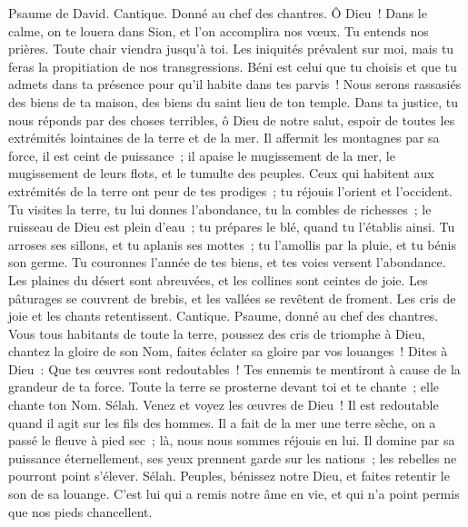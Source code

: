 \begin{multicols}{2}
\VerseOne{}Psaume de David. Cantique. Donné au chef des chantres.
Ô Dieu~! Dans le calme, on te louera dans Sion, et l'on accomplira nos vœux.
Tu entends nos prières. Toute chair viendra jusqu'à toi.
Les iniquités prévalent sur moi, mais tu feras la propitiation de nos transgressions.
Béni est celui que tu choisis et que tu admets dans ta présence pour qu'il habite dans tes parvis~! Nous serons rassasiés des biens de ta maison, des biens du saint lieu de ton temple.
Dans ta justice, tu nous réponds par des choses terribles, ô Dieu de notre salut, espoir de toutes les extrémités lointaines de la terre et de la mer.
Il affermit les montagnes par sa force, il est ceint de puissance~;
il apaise le mugissement de la mer, le mugissement de leurs flots, et le tumulte des peuples.
Ceux qui habitent aux extrémités de la terre ont peur de tes prodiges~; tu réjouis l'orient et l'occident.
Tu visites la terre, tu lui donnes l'abondance, tu la combles de richesses~; le ruisseau de Dieu est plein d'eau~; tu prépares le blé, quand tu l'établis ainsi.
Tu arroses ses sillons, et tu aplanis ses mottes~; tu l'amollis par la pluie, et tu bénis son germe.
Tu couronnes l'année de tes biens, et tes voies versent l'abondance.
Les plaines du désert sont abreuvées, et les collines sont ceintes de joie.
Les pâturages se couvrent de brebis, et les vallées se revêtent de froment. Les cris de joie et les chants retentissent.
\VerseOne{}Cantique. Psaume, donné au chef des chantres. Vous tous habitants de toute la terre, poussez des cris de triomphe à Dieu,
chantez la gloire de son Nom, faites éclater sa gloire par vos louanges~!
Dites à Dieu~: Que tes œuvres sont redoutables~! Tes ennemis te mentiront à cause de la grandeur de ta force.
Toute la terre se prosterne devant toi et te chante~; elle chante ton Nom. Sélah.
Venez et voyez les œuvres de Dieu~! Il est redoutable quand il agit sur les fils des hommes.
Il a fait de la mer une terre sèche, on a passé le fleuve à pied sec~; là, nous nous sommes réjouis en lui.
Il domine par sa puissance éternellement, ses yeux prennent garde sur les nations~; les rebelles ne pourront point s'élever. Sélah.
Peuples, bénissez notre Dieu, et faites retentir le son de sa louange.
C'est lui qui a remis notre âme en vie, et qui n'a point permis que nos pieds chancellent.

\end{multicols}
